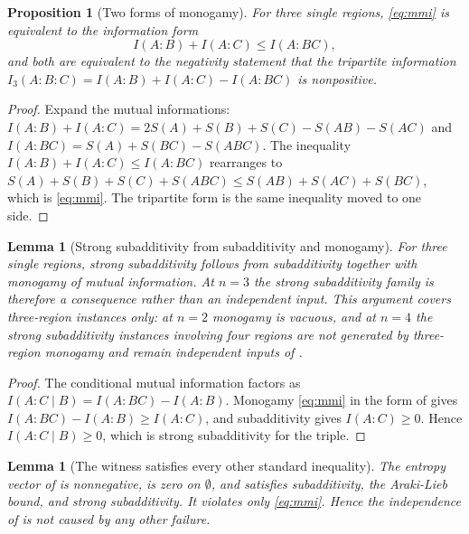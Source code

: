 \documentclass[11pt,letterpaper]{article}
\newtheorem{proposition}[theorem]{Proposition}
\newtheorem{lemma}[theorem]{Lemma}
\theoremstyle{definition}
\theoremstyle{remark}
\begin{document}
\begin{proposition}[Two forms of monogamy]\label{prop:mmiform}
For three single regions, \eqref{eq:mmi} is equivalent to the information form
\[
I(A{:}B) + I(A{:}C) \le I(A{:}BC),
\]
and both are equivalent to the negativity statement that the tripartite information $I_3(A{:}B{:}C) = I(A{:}B) + I(A{:}C) - I(A{:}BC)$ is nonpositive.
\end{proposition}

\begin{proof}
Expand the mutual informations: $I(A{:}B) + I(A{:}C) = 2S(A) + S(B) + S(C) - S(AB) - S(AC)$ and $I(A{:}BC) = S(A) + S(BC) - S(ABC)$. The inequality $I(A{:}B) + I(A{:}C) \le I(A{:}BC)$ rearranges to $S(A) + S(B) + S(C) + S(ABC) \le S(AB) + S(AC) + S(BC)$, which is \eqref{eq:mmi}. The tripartite form is the same inequality moved to one side.
\end{proof}

\begin{lemma}[Strong subadditivity from subadditivity and monogamy]\label{lem:ssaredundant}
For three single regions, strong subadditivity follows from subadditivity together with monogamy of mutual information. At $n = 3$ the strong subadditivity family is therefore a consequence rather than an independent input. This argument covers three-region instances only: at $n = 2$ monogamy is vacuous, and at $n = 4$ the strong subadditivity instances involving four regions are not generated by three-region monogamy and remain independent inputs of .
\end{lemma}

\begin{proof}
The conditional mutual information factors as $I(A{:}C \mid B) = I(A{:}BC) - I(A{:}B)$. Monogamy \eqref{eq:mmi} in the form of  gives $I(A{:}BC) - I(A{:}B) \ge I(A{:}C)$, and subadditivity gives $I(A{:}C) \ge 0$. Hence $I(A{:}C \mid B) \ge 0$, which is strong subadditivity for the triple.
\end{proof}

\begin{lemma}[The witness satisfies every other standard inequality]\label{lem:witnessclean}
The entropy vector of  is nonnegative, is zero on $\emptyset$, and satisfies subadditivity, the Araki-Lieb bound, and strong subadditivity. It violates only \eqref{eq:mmi}. Hence the independence of  is not caused by any other failure.
\end{lemma}
\end{document}
